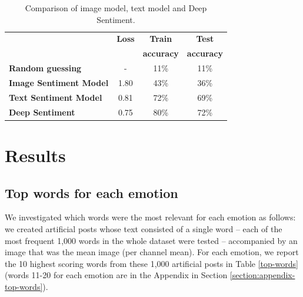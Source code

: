 \documentclass{article} %
\begin{document}
\begin{table}[H]
\caption{Comparison of image model, text model and Deep Sentiment.}
\begin{center}
    \begin{tabular}{ l | c | c | c}
    & \textbf{Loss} & \textbf{Train} & \textbf{Test} \\
    & & \textbf{accuracy} & \textbf{accuracy} \\ \hline
    \textbf{Random guessing} & - & 11\% & 11\% \\ \hline
    \textbf{Image Sentiment Model}  & 1.80 & 43\% & 36\% \\ \hline
    \textbf{Text Sentiment Model} & 0.81 & 72\% & 69\% \\ \hline
    \textbf{Deep Sentiment} & 0.75 & 80\% & 72\% \\
    \end{tabular}
\end{center} 
\label{all-results}
\end{table}

\section{Results}
\label{section:results}
\subsection{Top words for each emotion}
We investigated which words were the most relevant for each emotion as follows: we created artificial posts whose text consisted of a single word -- each of the most frequent 1,000 words in the whole dataset were tested -- accompanied by an image that was the mean image (per channel mean). For each emotion, we report the 10 highest scoring words from these 1,000 artificial posts in Table \ref{top-words} 
(words 11-20 for each emotion are in the Appendix in Section \ref{section:appendix-top-words}).
\end{document}
